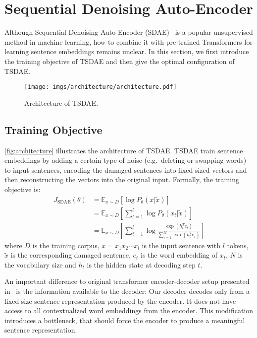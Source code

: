 \documentclass[11pt]{article}
\begin{document}
\section{Sequential Denoising Auto-Encoder} 
Although Sequential Denoising Auto-Encoder (SDAE)~\citep{DBLP:journals/jmlr/VincentLLBM10,Goodfellow-et-al-2016,DBLP:conf/naacl/HillCK16} is a popular unsupervised method in machine learning, how to combine it with pre-trained Transformers for learning sentence embeddings remains unclear. In this section, we first introduce the training objective of TSDAE and then give the optimal configuration of TSDAE.

\begin{figure}[t]
  \centering
  \texttt{[image: imgs/architecture/architecture.pdf]}
  \caption{Architecture of TSDAE.}
  \label{fig:architecture}
\end{figure}


\subsection{Training Objective}
\autoref{fig:architecture} illustrates the architecture of TSDAE. TSDAE train sentence embeddings by adding a certain type of noise (e.g.\ deleting or swapping words) to input sentences, encoding the damaged sentences into fixed-sized vectors and then reconstructing the vectors into the original input. Formally, the training objective is:
\begin{align*}
J_{\mathrm{SDAE}}(\theta) &= \mathbb{E}_{x\sim D}[\log P_\theta(x|\tilde{x})]  \\
         &= \mathbb{E}_{x\sim D}[\sum_{t=1}^{l} \log P_\theta(x_t|\tilde{x})] \\
         &= \mathbb{E}_{x\sim D}[\sum_{t=1}^l \log \frac{\exp(h_t^Te_t)}{\sum_{i=1}^{N}\exp(h_t^Te_i)}]    
\end{align*}
where $D$ is the training corpus, $x=x_1x_2\cdots x_l$ is the input sentence with $l$ tokens, $\tilde{x}$ is the corresponding damaged sentence, $e_t$ is the word embedding of $x_t$, $N$ is the vocabulary size and $h_t$ is the hidden state at decoding step $t$. 

An important difference to original transformer encoder-decoder setup presented in~\citet{DBLP:conf/nips/VaswaniSPUJGKP17} is the information available to the decoder: Our decoder decodes only from a fixed-size sentence representation produced by the encoder. It does not have access to all contextualized word embeddings from the encoder. This modification introduces a bottleneck, that should force the encoder to produce a meaningful sentence representation. 
\end{document}
